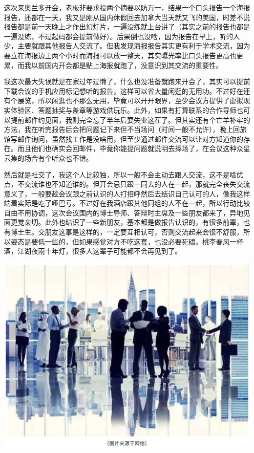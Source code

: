 \documentclass[
]{book}
\begin{document}
这次来奥兰多开会，老板非要求投两个摘要以防万一，结果一个口头报告一个海报报告，还都在一天，我又是刚从国内休假回去加拿大当天就又飞的美国，时差不说报告都是前一天晚上才作出幻灯片，一遍没练就上台讲了（其实之前的报告也都是一遍没练，不过起码都会提前做好）。后果倒也没啥，因为报告在早上，听的人少，主要就跟其他报告人交流了。但我发现海报报告其实更有利于学术交流，因为要立在海报边上两个小时而海报可以放一整天，其实曝光率比口头报告更高也更累，而我以前国内开会都是贴上海报就跑了，没意识到其交流的重要性。

我这次最大失误就是在家过年过懒了，什么也没准备就跑来开会了，其实可以提前下载会议的手机应用标记想听的报告，这样可以省大量闲逛的无用功。不过好在还有个展览，所以闲逛也不那么无用，毕竟可以开开眼界，至少会议方提供了虚拟现实体验区、答题抽奖与盖章等游戏供玩乐。此外，如果有打算联系的合作导师也可以提前邮件约见面，我则完全忘了半年后要失业这茬了。但其实还有个亡羊补牢的方法，我在听完报告后会把问题记下来但不当场问（时间一般不允许），晚上回旅馆写邮件询问，虽然找工作是没啥用，但至少通过邮件交流可以让对方知道你的存在。而且他们也确实会回邮件，毕竟你能提问题就说明去捧场了，在会议这种众星云集的场合有个听众也不错。

然后就是社交了，我这个人比较独，所以一般不会主动去跟人交流，这不是啥优点，不交流谁也不知道谁的。但开会忌只跟一同去的人在一起，那就完全丧失交流意义了，一般要趁会议跟之前认识的人打招呼然后去结识自己认可的人，像我这样端着实际是吃了哑巴亏。不过好在我酒店跟其他同组的人不在一起，所以行动比较自由不用协调，这次会议国内的博士导师、答辩时主席及一些朋友都来了，异地见面更觉亲切。此外也结识了一些新朋友，基本都是做报告认识的，有很多前辈，也有博士生。交朋友这事是这样的，一定要互相认可，否则交流起来会很不舒服，所以姿态是要低一些的，但如果感觉对方不吃这套，也没必要死磕。桃李春风一杯酒，江湖夜雨十年灯，很多人这辈子可能都不会再见到了。

\includegraphics[width=8.33in]{images/pittcon4}
\end{document}
